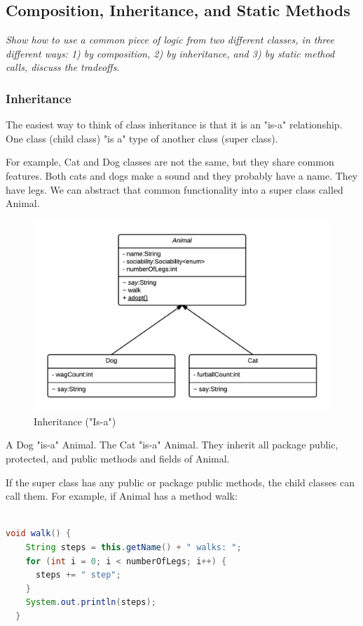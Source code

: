 \subsection{Composition, Inheritance, and Static Methods}
\textit{Show how to use a common piece of logic from two different classes, in three different ways: 1) by composition, 2) by inheritance, and 3) by static method calls, discuss the tradeoffs.}

\subsubsection{Inheritance}\label{s:inheritance}
The easiest way to think of class inheritance is that it is an "is-a" relationship. One class (child class) "is a" type of another class (super class).

For example, Cat and Dog classes are not the same, but they share common features. Both cats and dogs make a sound and they probably have a name. They have legs. We can abstract that common functionality into a super class called Animal.

\begin{figure}[H]\centering %
\includegraphics[width=0.9\linewidth]{images/inheritance}
\caption{Inheritance ("Is-a")}
\label{fig:inheritance}
\end{figure}

A Dog "is-a" Animal. The Cat "is-a" Animal. They inherit all package public, protected, and public methods and fields of Animal.

If the super class has any public or package public methods, the child classes can call them. For example, if Animal has a method walk:
\begin{lstlisting}[language=Java]

void walk() {
    String steps = this.getName() + " walks: ";
    for (int i = 0; i < numberOfLegs; i++) {
      steps += " step";
    }
    System.out.println(steps);
  }

\end{lstlisting}

